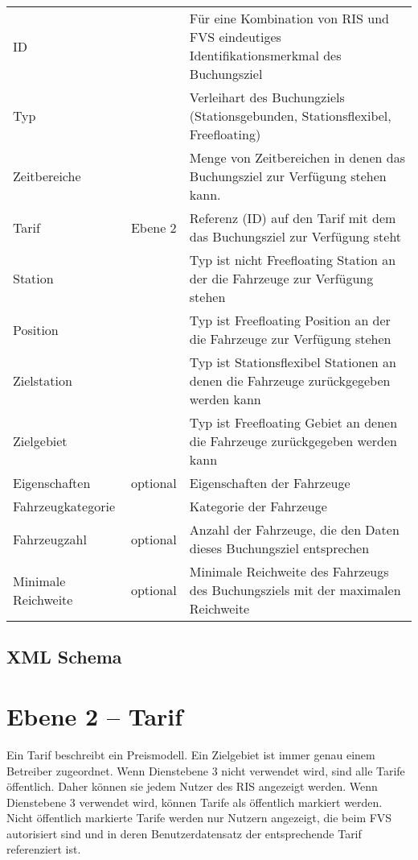 \begin{flushleft}
\begin{tabularx}{\linewidth}{l>{\raggedright\arraybackslash}l>{\raggedright\arraybackslash}X} 
\toprule
ID & & Für eine Kombination von RIS und FVS eindeutiges Identifikationsmerkmal des Buchungsziel \\
Typ & & Verleihart des Buchungziels (Stationsgebunden, Stationsflexibel, Freefloating) \\
Zeitbereiche & & Menge von Zeitbereichen in denen das Buchungsziel zur Verfügung stehen kann. \\
Tarif & Ebene 2 & Referenz (ID) auf den Tarif mit dem das Buchungsziel zur Verfügung steht \\
Station & & Typ ist nicht Freefloating	Station an der die Fahrzeuge zur Verfügung stehen \\
Position & & Typ ist Freefloating	Position an der die Fahrzeuge zur Verfügung stehen \\
Zielstation & & Typ ist Stationsflexibel	Stationen an denen die Fahrzeuge zurückgegeben werden kann \\
Zielgebiet & & Typ ist Freefloating	Gebiet an denen die Fahrzeuge zurückgegeben werden kann \\
Eigenschaften & optional & Eigenschaften der Fahrzeuge \\
Fahrzeugkategorie	 & & Kategorie der Fahrzeuge \\
Fahrzeugzahl & optional & Anzahl der Fahrzeuge, die den Daten dieses Buchungsziel entsprechen \\
Minimale Reichweite & optional & Minimale Reichweite des Fahrzeugs des Buchungsziels mit der maximalen Reichweite \\
\bottomrule
\end{tabularx}
\end{flushleft}

\subsection{XML Schema}



\section{Ebene 2 -- Tarif}
Ein Tarif beschreibt ein Preismodell. Ein Zielgebiet ist immer genau einem Betreiber zugeordnet. Wenn Dienstebene 3 nicht verwendet wird, sind alle Tarife öffentlich. Daher können sie jedem Nutzer des RIS angezeigt werden. Wenn Dienstebene 3 verwendet wird, können Tarife als öffentlich markiert werden. Nicht öffentlich markierte Tarife werden nur Nutzern angezeigt, die beim FVS autorisiert sind und in deren Benutzerdatensatz der entsprechende Tarif referenziert ist.

